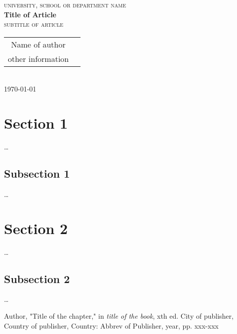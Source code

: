 \documentclass[10pt, a4paper, oneside]{article}
\begin{document}
\thispagestyle{empty}
\begin{center}
  \textsc{university, school or department name} \\ [60pt] 

  \textbf{{\LARGE Title of Article}} \\ [1pt]
  \textsc{{\large subtitle of article }} \\ [20pt]

  \begin{tabular}{cc}
    Name of author  \\
    other information
  \end{tabular} \\ [20pt]
  \today \\
\end{center}

\tableofcontents

\begin{abstract}
\ldots
\end{abstract}

\newpage

\section{Section 1}
\ldots
\subsection{Subsection 1}
\ldots

\section{Section 2}
\ldots
\subsection{Subsection 2}
\ldots
      
\begin{thebibliography}{9}

  Author,
  "Title of the chapter," in 
  \emph{title of the book},
  xth ed.
  City of publisher,
  Country of publisher,
  Country:
  Abbrev of Publisher,
  year,
  pp. xxx-xxx

\end{thebibliography}      
      
\end{document}
